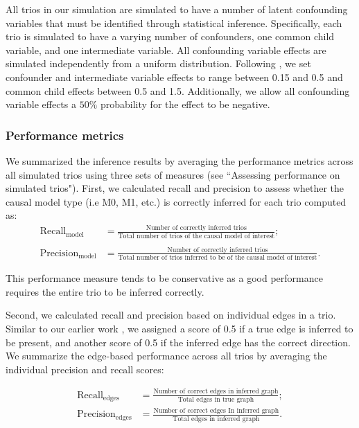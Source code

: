 \documentclass[12pt,letterpaper]{report}
\begin{document}
\begin{doublespace}
All trios in our simulation are simulated to have a number of latent confounding variables that must be identified through statistical inference. Specifically, each trio is simulated to have a varying number of confounders, one common child variable, and one intermediate variable. All confounding variable effects are simulated independently from a uniform distribution. 
Following \cite{yang2017identifying}, we set confounder and intermediate variable effects to range between 0.15 and 0.5 and common child effects between 0.5 and 1.5. Additionally, we allow all confounding variable effects a $50\%$ probability for the effect to be negative. 

\subsubsection{Performance metrics}

We summarized the inference results by averaging the performance metrics across all simulated trios using three sets of measures (see ``Assessing performance on simulated trios"). First, we calculated recall and precision to assess whether the causal model type (i.e M0, M1, etc.) is correctly inferred for each trio computed as:
\begin{align}
	\text{Recall}_\text{model} &= \frac{\text{Number of correctly inferred trios}}{\text{Total number of trios of the causal model of interest}}; \label{eq:rec_total}\\
	\nonumber \\
	\text{Precision}_\text{model} &= \frac{\text{Number of correctly inferred trios}}{\text{Total number of trios inferred to be of the causal model of interest}}. \label{eq:prec_total}
\end{align}


\noindent This performance measure tends to be conservative as a good performance requires the entire trio to be inferred correctly. 

Second, we calculated recall and precision based on individual edges in a trio.  Similar to our earlier work \cite{badsha2019learning}, we assigned a score of 0.5 if a true edge is inferred to be present, and another score of 0.5 if the inferred edge has the correct direction. We summarize the edge-based performance across all trios by averaging the individual precision and recall scores: 

\begin{align}
	\text{Recall}_\text{edges} &= \frac{\text{Number of correct edges in inferred graph}}{\text{Total edges in true graph}}; \label{eq:rec_edges}\\
	\text{Precision}_\text{edges} &= \frac{\text{Number of correct edges In inferred graph}}{\text{Total edges in inferred graph}}.\label{eq:prec_edges}
\end{align}


\end{doublespace}
\end{document}
